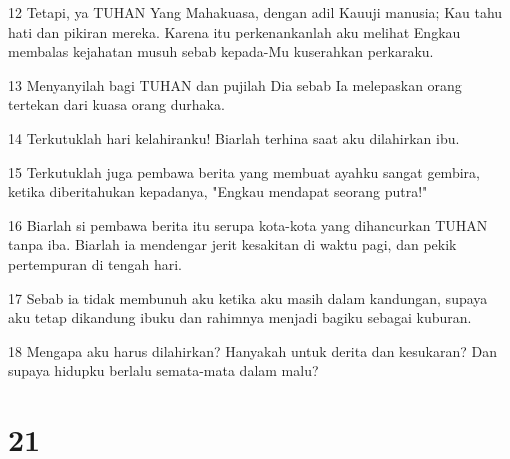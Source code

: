 \par 12 Tetapi, ya TUHAN Yang Mahakuasa, dengan adil Kauuji manusia; Kau tahu hati dan pikiran mereka. Karena itu perkenankanlah aku melihat Engkau membalas kejahatan musuh sebab kepada-Mu kuserahkan perkaraku.
\par 13 Menyanyilah bagi TUHAN dan pujilah Dia sebab Ia melepaskan orang tertekan dari kuasa orang durhaka.
\par 14 Terkutuklah hari kelahiranku! Biarlah terhina saat aku dilahirkan ibu.
\par 15 Terkutuklah juga pembawa berita yang membuat ayahku sangat gembira, ketika diberitahukan kepadanya, "Engkau mendapat seorang putra!"
\par 16 Biarlah si pembawa berita itu serupa kota-kota yang dihancurkan TUHAN tanpa iba. Biarlah ia mendengar jerit kesakitan di waktu pagi, dan pekik pertempuran di tengah hari.
\par 17 Sebab ia tidak membunuh aku ketika aku masih dalam kandungan, supaya aku tetap dikandung ibuku dan rahimnya menjadi bagiku sebagai kuburan.
\par 18 Mengapa aku harus dilahirkan? Hanyakah untuk derita dan kesukaran? Dan supaya hidupku berlalu semata-mata dalam malu?

\chapter{21}

